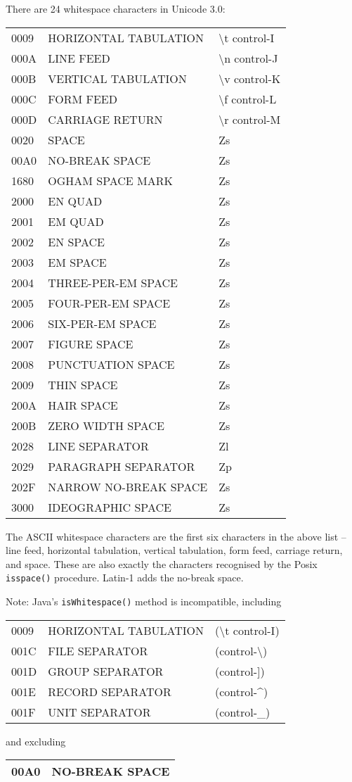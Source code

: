 There are 24 whitespace characters in Unicode 3.0:

\begin{longtable}[]{@{}lll@{}}
\toprule
0009 & HORIZONTAL TABULATION & \textbackslash{}t
control-I\tabularnewline
000A & LINE FEED & \textbackslash{}n control-J\tabularnewline
000B & VERTICAL TABULATION & \textbackslash{}v control-K\tabularnewline
000C & FORM FEED & \textbackslash{}f control-L\tabularnewline
000D & CARRIAGE RETURN & \textbackslash{}r control-M\tabularnewline
0020 & SPACE & Zs\tabularnewline
00A0 & NO-BREAK SPACE & Zs\tabularnewline
1680 & OGHAM SPACE MARK & Zs\tabularnewline
2000 & EN QUAD & Zs\tabularnewline
2001 & EM QUAD & Zs\tabularnewline
2002 & EN SPACE & Zs\tabularnewline
2003 & EM SPACE & Zs\tabularnewline
2004 & THREE-PER-EM SPACE & Zs\tabularnewline
2005 & FOUR-PER-EM SPACE & Zs\tabularnewline
2006 & SIX-PER-EM SPACE & Zs\tabularnewline
2007 & FIGURE SPACE & Zs\tabularnewline
2008 & PUNCTUATION SPACE & Zs\tabularnewline
2009 & THIN SPACE & Zs\tabularnewline
200A & HAIR SPACE & Zs\tabularnewline
200B & ZERO WIDTH SPACE & Zs\tabularnewline
2028 & LINE SEPARATOR & Zl\tabularnewline
2029 & PARAGRAPH SEPARATOR & Zp\tabularnewline
202F & NARROW NO-BREAK SPACE & Zs\tabularnewline
3000 & IDEOGRAPHIC SPACE & Zs\tabularnewline
\bottomrule
\end{longtable}

The ASCII whitespace characters are the first six characters in the
above list -- line feed, horizontal tabulation, vertical tabulation,
form feed, carriage return, and space. These are also exactly the
characters recognised by the Posix \texttt{isspace()} procedure. Latin-1
adds the no-break space.

Note: Java's \texttt{isWhitespace()} method is incompatible, including

\begin{longtable}[]{@{}lll@{}}
\toprule
0009 & HORIZONTAL TABULATION & (\textbackslash{}t
control-I)\tabularnewline
001C & FILE SEPARATOR & (control-\textbackslash{})\tabularnewline
001D & GROUP SEPARATOR & (control-{]})\tabularnewline
001E & RECORD SEPARATOR & (control-\^{})\tabularnewline
001F & UNIT SEPARATOR & (control-\_)\tabularnewline
\bottomrule
\end{longtable}

and excluding

\begin{longtable}[]{@{}ll@{}}
\toprule
00A0 & NO-BREAK SPACE\tabularnewline
\bottomrule
\end{longtable}

